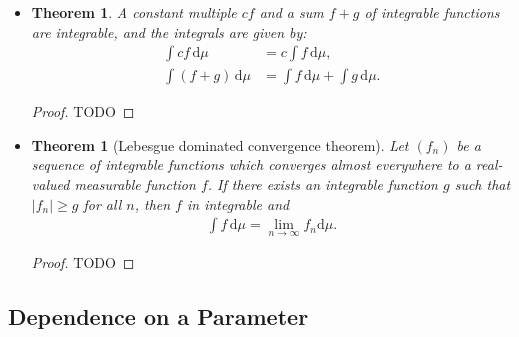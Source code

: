 \documentclass[10pt]{article}
\newtheorem{theorem}[lemma]{Theorem}
\newcommand{\dee}{\mathrm{d}}
\begin{document}
\begin{itemize}
  \begin{proof}
    First, we have that $|f| \in M^+$, so $\int |f|\, \dee\mu$ is well defined. Moreover, we know that it has a finite value because we can apply Lemma~\ref{lemma:integral-is-monotone} to $|f|$ and $|g|$ to conclude that $\int |f|\,\dee\mu \leq \int |g|\,\dee\mu$. Now, we can apply Theorem~\ref{theorem:absolute-integrability} to conclude that $f$ is also integrable.
  \end{proof}

  \item \begin{theorem}
    A constant multiple $cf$ and a sum $f+g$ of integrable functions are integrable, and the integrals are given by:
    \begin{align*}
      \int cf\, \dee\mu &= c \int f\,\dee\mu,\\
      \int (f+g)\, \dee\mu &= \int f\,\dee\mu + \int g\,\dee\mu.
    \end{align*}
  \end{theorem}

  \begin{proof}
    TODO
  \end{proof}

  \item \begin{theorem}[Lebesgue dominated convergence theorem]
    Let $(f_n)$ be a sequence of integrable functions which converges almost everywhere to a real-valued measurable function $f$. If there exists an integrable function $g$ such that $|f_n| \geq g$  for all $n$, then $f$ in integrable and
    \begin{align*}
      \int f\,\dee\mu = \lim_{n\rightarrow \infty} f_n \dee\mu.
    \end{align*}
  \end{theorem}

  \begin{proof}
    TODO
  \end{proof}  
\end{itemize}

\subsection{Dependence on a Parameter}
\end{document}
